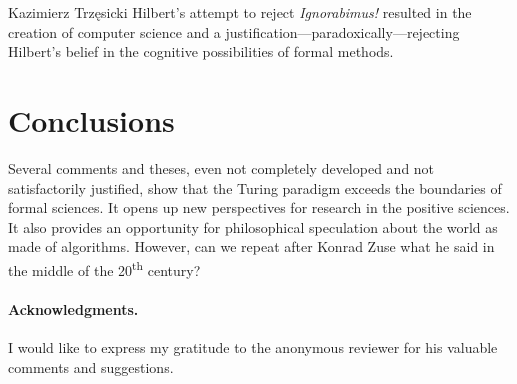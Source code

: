 \begin{artengenv}{Kazimierz Trzęsicki}
Hilbert's attempt to reject \emph{Ignorabimus!} resulted in the creation of computer science and a justification---paradoxically---rejecting Hilbert's belief in the cognitive possibilities of formal methods.




\section{Conclusions} 
Several comments and theses, even not completely developed and not satisfactorily justified, show that the Turing paradigm exceeds the boundaries of formal sciences. It opens up new perspectives for research in the positive sciences. It also provides an opportunity for philosophical speculation about the world as made of algorithms. However, can we  repeat after Konrad Zuse \parencite[p.65]{German2012} what he said in the middle of the 20\textsuperscript{th} century? 

\paragraph{Acknowledgments.}I would like to express my gratitude to the anonymous reviewer for his valuable comments and suggestions.



\end{artengenv}